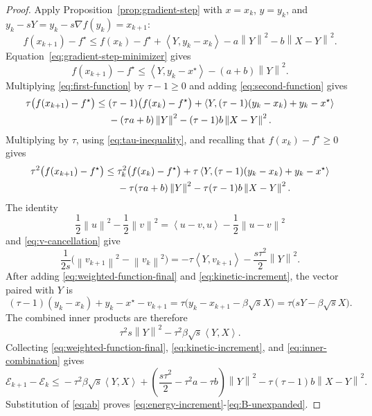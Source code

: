 \documentclass[11pt]{article}
\theoremstyle{plain}
\theoremstyle{definition}
\newcommand{\norm}[1]{\left\lVert #1\right\rVert}
\newcommand{\inner}[2]{\left\langle #1,#2\right\rangle}
\begin{document}
\begin{proof}
Apply Proposition~\ref{prop:gradient-step} with $x=x_k$, $y=y_k$, and
$y_k-sY=y_k-s\nabla f(y_k)=x_{k+1}$:
\begin{equation}
\label{eq:first-function}
f(x_{k+1})-f^\star
\leq f(x_k)-f^\star+\inner{Y}{y_k-x_k}
-a\norm{Y}^2-b\norm{X-Y}^2.
\end{equation}
Equation~\eqref{eq:gradient-step-minimizer} gives
\begin{equation}
\label{eq:second-function}
f(x_{k+1})-f^\star
\leq\inner{Y}{y_k-x^\star}-(a+b)\norm{Y}^2.
\end{equation}
{Multiplying \eqref{eq:first-function} by $\tau-1\geq0$ and adding
\eqref{eq:second-function} gives}
\begin{align}
\tau\bigl(f(x_{k+1})-f^\star\bigr)
\leq{}&(\tau-1)\bigl(f(x_k)-f^\star\bigr)
+\inner{Y}{(\tau-1)(y_k-x_k)+y_k-x^\star}\notag\\
&-(\tau a+b)\norm{Y}^2-(\tau-1)b\norm{X-Y}^2.
\label{eq:weighted-function}
\end{align}
{Multiplying by $\tau$, using \eqref{eq:tau-inequality}, and recalling
that $f(x_k)-f^\star\geq0$ gives}
\begin{align}
\tau^2\bigl(f(x_{k+1})-f^\star\bigr)
\leq{}&\tau_k^2\bigl(f(x_k)-f^\star\bigr)
+\tau\inner{Y}{(\tau-1)(y_k-x_k)+y_k-x^\star}\notag\\
&-\tau(\tau a+b)\norm{Y}^2
-\tau(\tau-1)b\norm{X-Y}^2.
\label{eq:weighted-function-final}
\end{align}
The identity
$$
\frac12\norm{u}^2-\frac12\norm{v}^2
=\inner{u-v}{u}-\frac12\norm{u-v}^2
$$
and \eqref{eq:v-cancellation} give
\begin{equation}
\label{eq:kinetic-increment}
\frac{1}{2s}\bigl(\norm{v_{k+1}}^2-\norm{v_k}^2\bigr)
=-\tau\inner{Y}{v_{k+1}}-\frac{s\tau^2}{2}\norm{Y}^2.
\end{equation}
After adding \eqref{eq:weighted-function-final} and
\eqref{eq:kinetic-increment}, the vector paired with $Y$ is
$$
(\tau-1)(y_k-x_k)+y_k-x^\star-v_{k+1}=\tau\bigl(y_k-x_{k+1}-\beta\sqrt{s}X\bigr)
=\tau\bigl(sY-\beta\sqrt{s}X\bigr).
$$
The combined inner products are therefore
\begin{equation}
\label{eq:inner-combination}
\tau^2s\norm{Y}^2-\tau^2\beta\sqrt{s}\inner{Y}{X}.
\end{equation}
Collecting \eqref{eq:weighted-function-final},
\eqref{eq:kinetic-increment}, and \eqref{eq:inner-combination} gives
$$
\mathcal E_{k+1}-\mathcal E_k
\leq{}-\tau^2\beta\sqrt{s}\inner{Y}{X}
+\left(\frac{s\tau^2}{2}-\tau^2a-\tau b\right)\norm{Y}^2-\tau(\tau-1)b\norm{X-Y}^2.
$$
Substitution of \eqref{eq:ab} proves
\eqref{eq:energy-increment}-\eqref{eq:B-unexpanded}.
\end{proof}
\end{document}
